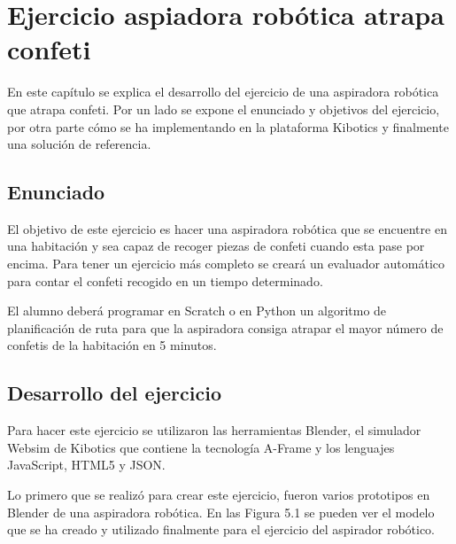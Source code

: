 \chapter{Ejercicio aspiadora robótica atrapa confeti}\label{chap:aspiradora}
En este capítulo se explica el desarrollo del ejercicio de una aspiradora robótica que atrapa confeti. Por un lado se expone el enunciado y objetivos del ejercicio, por otra parte cómo se ha implementando en la plataforma Kibotics y finalmente una solución de referencia.


\section{Enunciado}
El objetivo de este ejercicio es hacer una aspiradora robótica que se encuentre en una habitación y sea capaz de recoger piezas de confeti cuando esta pase por encima. Para tener un ejercicio más completo se creará un evaluador automático para contar el confeti recogido en un tiempo determinado.

El alumno deberá programar en Scratch o en Python un algoritmo de planificación de ruta para que la aspiradora consiga atrapar el mayor número de confetis de la habitación en 5 minutos.

\section{Desarrollo del ejercicio}
Para hacer este ejercicio se utilizaron las herramientas Blender, el simulador Websim de Kibotics que contiene la tecnología A-Frame y los lenguajes JavaScript, HTML5 y JSON.

Lo primero que se realizó para crear este ejercicio, fueron varios prototipos en Blender de una aspiradora robótica. En las Figura 5.1 se pueden ver el modelo que se ha creado y  utilizado finalmente para el ejercicio del aspirador robótico.
 
